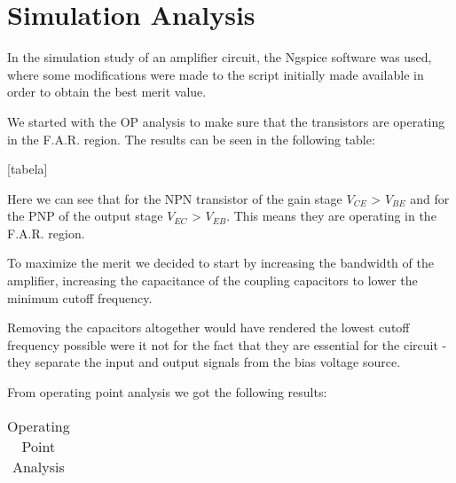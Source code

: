 \section{Simulation Analysis}
\label{sec:simulation} 

In the simulation study of an amplifier circuit, the Ngspice software was used, where some modifications were made to the script initially made available in order to obtain the best merit value.

We started with the OP analysis to make sure that the transistors are operating in the F.A.R. region. The results can be seen in the following table:

[tabela]


Here we can see that for the NPN transistor of the gain stage $V_{CE}$ > $V_{BE}$ and for the PNP of the output stage $V_{EC}$ > $V_{EB}$. This means they are operating in the F.A.R. region.

To maximize the merit we decided to start by increasing the bandwidth of the amplifier, increasing the capacitance of the coupling capacitors to lower the minimum cutoff frequency.

Removing the capacitors altogether would have rendered the lowest cutoff frequency possible were it not for the fact that they are essential for the circuit - they separate the input and output signals from the bias voltage source.









































From operating point analysis we got the following results:
\FloatBarrier
\begin{table}[h]
  \centering
  \begin{tabular}{|c|c|c|c|c|}
    \hline    
    
    \hline
  \end{tabular}
  \caption{Operating Point Analysis}
  \label{tab:Spice1}
\end{table}
\FloatBarrier  

